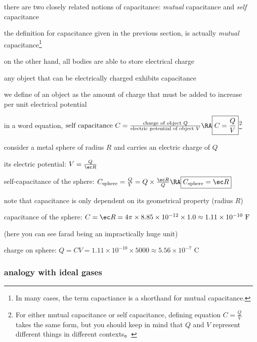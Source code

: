 there are two closely related notions of capacitance: \emph{mutual} capacitance and \emph{self} capacitance

the definition for capacitance given in the previous section, is actually \emph{mutual} capacitance\footnote{In many cases, the term capactiance is a shorthand for mutual capacitance.}

on the other hand, all bodies are able to store electrical charge

any object that can be electrically charged exhibits capacitance

we define  of an object as the amount of charge that must be added to increase per unit electrical potential

in a word equation, $ \text{self capacitance }C=\frac{\text{charge of object }Q}{\text{electric potential of object }V} \RA \boxed{C=\frac{Q}{V}}$\footnote{For either mutual capacitance or self capacitance, defining equation $C=\frac{Q}{V}$ takes the same form, but you should keep in mind that $Q$ and $V$ represent different things in different contexts。}


consider a metal sphere of radius $R$ and carries an electric charge of $Q$

its electric potential: $V = \frac{Q}{\ec R}$

self-capacitance of the sphere: $C_\text{sphere} = \frac{Q}{V} = Q \times \frac{\ec R}{Q} \RA \boxed{C_\text{sphere} = \ec R}$

note that capacitance is only dependent on its geometrical property (radius $R$) \eoe


\sol capacitance of the sphere: $C = \ec R = 4\pi\times8.85\times10^{-12}\times 1.0 \approx 1.11\times10^{-10} \text{ F}$

(here you can see farad being an impractically huge unit)

charge on sphere: $Q = CV = 1.11\times10^{-10} \times 5000 \approx 5.56\times 10^{-7} \text{ C}$ \eoe

\subsubsection*{analogy with ideal gases}

